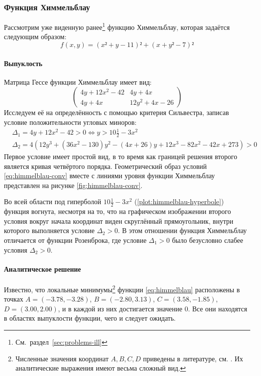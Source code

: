 \subsubsection{Функция Химмельблау}
\label{sec:himmelblau}

Рассмотрим уже виденную
ранее\footnote{См. раздел \ref{sec:problems-ill}} функцию Химмельблау,
которая задаётся следующим образом:
\begin{equation}
  \label{eq:himmelblau}
  \tag{$\chi$-\theequation}
  f(x, y) = (x² + y - 11)² + (x + y² - 7)²
\end{equation}

\paragraph{Выпуклость}

Матрица Гессе функции Химмельблау имеет вид:
\begin{equation}
  \label{eq:himmelblau-hess}
  \begin{pmatrix}
    4y+12x^2-42 & 4y+4x\\
    4y+4x & 12y^2+4x-26
  \end{pmatrix}
\end{equation}
Исследуем её на определённость с помощью критерия Сильвестра, записав
условие положительности угловых миноров:
\begin{align}
  \label{eq:himmelblau-conv}
  &\Delta_1 = 4y+12x^2-42 > 0 \iff y > 10\frac{1}{2}-3x^2 \\
  &\Delta_2 =
  4\left(12y^3+(36x^2-130)y^2-(4x+26)y+12x^3-82x^2-42x+273\right) > 0
\end{align}
Первое условие имеет простой вид, в то время как границей решения
второго является кривая четвёртого порядка. Геометрический образ
условий \eqref{eq:himmelblau-conv} вместе с линиями уровня функции
Химмельблау представлен на рисунке \ref{fig:himmelblau-conv}. 



Во всей области под гиперболой $10\frac{1}{2}-3x^2$
(\ref{plot:himmelblau-hyperbole}) функция вогнута, несмотря на то, что
на графическом изображении второго условия вокруг начала координат
виден скруглённый прямоугольник, внутри которого выполняется условие
$\Delta_2>0$. В этом отношении функция Химмельблау отличается от
функции Розенброка, где условие $\Delta_1>0$ было безусловно слабее
условия $\Delta_2>0$.

\paragraph{Аналитическое решение}
Известно, что локальные минимумы\footnote{Численные значения координат
  $A, B, C, D$ приведены в литературе, см. \cite{himmelblau75}. Их
  аналитические выражения имеют весьма сложный вид.} функции
\eqref{eq:himmelblau} расположены в точках $A=(-3.78, -3.28)$,
$B=(-2.80, 3.13)$, $C=(3.58, -1.85)$, \mbox{$D=(3.00, 2.00)$}, и в
каждой из них достигается значение $0$. 
Все они находятся в областях выпуклости функции, чего и следует
ожидать.

